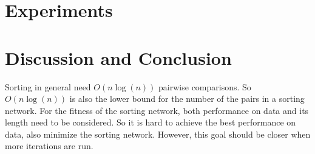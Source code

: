 \documentclass[11pt]{article}
\begin{document}
\section{Experiments}

\section{Discussion and Conclusion}

Sorting in general need $O(n\log(n))$ pairwise comparisons. So
$O(n\log(n))$ is also the lower bound for the number of the pairs in
a sorting network. For the fitness of the sorting network, both
performance on data and its length need to be considered. So it is
hard to achieve the best performance on data, also minimize the
sorting network. However, this goal should be closer when more
iterations are run.
\end{document}
